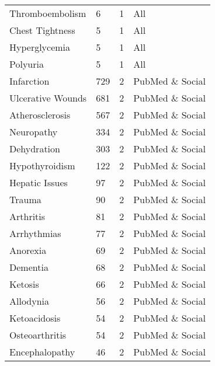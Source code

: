 \documentclass[referee,bst/sn-basic]{sn-jnl}%
\theoremstyle{thmstyletwo}%
\theoremstyle{thmstylethree}%
\begin{document}
\begin{appendices}
\begin{longtable}{llll}
Thromboembolism                          & 6         & 1    & All                     \\
Chest Tightness                          & 5         & 1    & All                     \\
Hyperglycemia                            & 5         & 1    & All                     \\
Polyuria                                 & 5         & 1    & All                     \\
Infarction                               & 729       & 2    & PubMed \& Social        \\
Ulcerative Wounds                        & 681       & 2    & PubMed \& Social        \\
Atherosclerosis                          & 567       & 2    & PubMed \& Social        \\
Neuropathy                               & 334       & 2    & PubMed \& Social        \\
Dehydration                              & 303       & 2    & PubMed \& Social        \\
Hypothyroidism                           & 122       & 2    & PubMed \& Social        \\
Hepatic Issues                           & 97        & 2    & PubMed \& Social        \\
Trauma                                   & 90        & 2    & PubMed \& Social        \\
Arthritis                                & 81        & 2    & PubMed \& Social        \\
Arrhythmias                              & 77        & 2    & PubMed \& Social        \\
Anorexia                                 & 69        & 2    & PubMed \& Social        \\
Dementia                                 & 68        & 2    & PubMed \& Social        \\
Ketosis                                  & 66        & 2    & PubMed \& Social        \\
Allodynia                                & 56        & 2    & PubMed \& Social        \\
Ketoacidosis                             & 54        & 2    & PubMed \& Social        \\
Osteoarthritis                           & 54        & 2    & PubMed \& Social        \\
Encephalopathy                           & 46        & 2    & PubMed \& Social        \\

\end{longtable}
\end{appendices}
\end{document}
